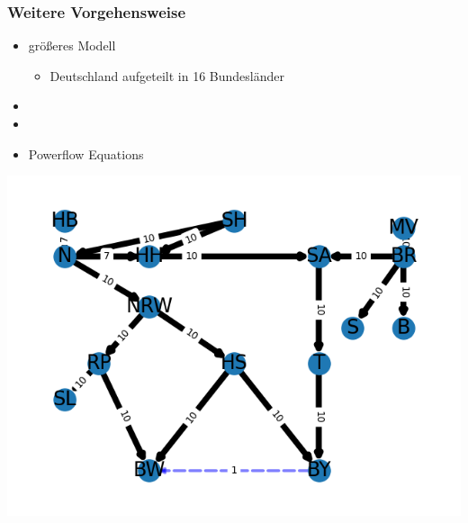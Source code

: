 \documentclass[aspectratio=169,t]{beamer}
\begin{document}
	\begin{frame}
		\frametitle{Weitere Vorgehensweise}
		\vspace*{0mm}
			\begin{minipage}{1\linewidth}
			\begin{minipage}{.5\linewidth}
				\begin{itemize}
					\item größeres Modell
					\begin{itemize}
						\item Deutschland aufgeteilt in 16 Bundesländer
					\end{itemize}
					\item 
					\item
					\item Powerflow Equations
				\end{itemize}
			\end{minipage}
			\hfill
			\begin{minipage}{.5\linewidth}
				\centering
				\includegraphics[width=.8\linewidth]{Example_graph_2.png}
				
			\end{minipage}
		\end{minipage}	
	
			
	\end{frame}
	
\end{document}
